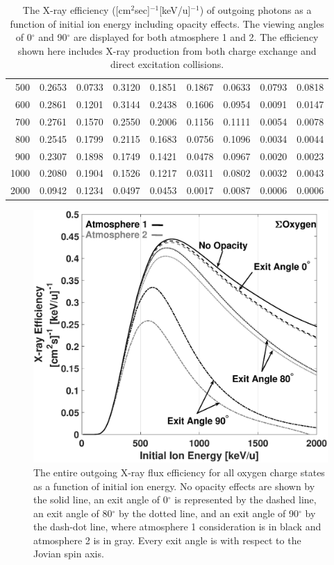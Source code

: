 \documentclass[draft]{agujournal2018}
\begin{document}
\begin{table}[ht]
\begin{tabular}{r|c|c|c|c|c|c|c|c}
    500      & 0.2653 & 0.0733 & 0.3120 & 0.1851 & 0.1867 & 0.0633 & 0.0793 & 0.0818 \\
    600      & 0.2861 & 0.1201 & 0.3144 & 0.2438 & 0.1606 & 0.0954 & 0.0091 & 0.0147 \\
    700      & 0.2761 & 0.1570 & 0.2550 & 0.2006 & 0.1156 & 0.1111 & 0.0054 & 0.0078 \\
    800      & 0.2545 & 0.1799 & 0.2115 & 0.1683 & 0.0756 & 0.1096 & 0.0034 & 0.0044 \\
    900      & 0.2307 & 0.1898 & 0.1749 & 0.1421 & 0.0478 & 0.0967 & 0.0020 & 0.0023 \\
    1000     & 0.2080 & 0.1904 & 0.1526 & 0.1217 & 0.0311 & 0.0802 & 0.0032 & 0.0043 \\
    2000     & 0.0942 & 0.1234 & 0.0497 & 0.0453 & 0.0017 & 0.0087 & 0.0006 & 0.0006 \\
    \hline
    \end{tabular}
    \caption{The X-ray efficiency ([cm$^2$sec]$^{-1}$[keV/u]$^{-1}$) of outgoing photons as a function of initial ion energy including opacity effects. The viewing angles of 0$^\circ$ and 90$^\circ$ are displayed for both atmosphere 1 and 2. The efficiency shown here includes X-ray production from both charge exchange and direct excitation collisions.}
    \label{tab:XrayEff}
\end{table}

\begin{figure}[ht]
    \centering
    \includegraphics[width=\textwidth]{Figures/OxyXrayEff.eps}
    \caption{The entire outgoing X-ray flux efficiency for all oxygen charge states as a function of initial ion energy. No opacity effects are shown by the solid line, an exit angle of 0$^{\circ}$ is represented by the dashed line, an exit angle of 80$^{\circ}$ by the dotted line, and an exit angle of 90$^{\circ}$ by the dash-dot line, where atmosphere 1 consideration is in black and atmosphere 2 is in gray. Every exit angle is with respect to the Jovian spin axis.}
    \label{fig:OxyXrayEff}
\end{figure}
\end{document}
